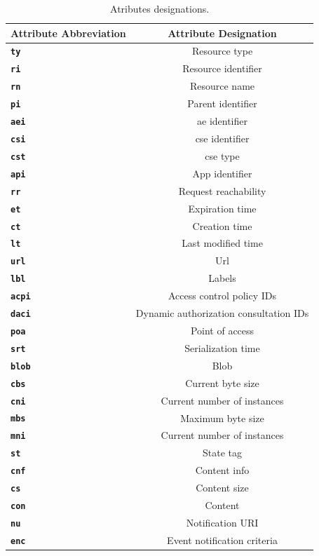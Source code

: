 \documentclass[a4paper,fleqn]{cas-dc}
\begin{document}
\begin{table}[h]
	\scriptsize
	\caption{Atributes designations.}
	\label{tab:attributesDesignations}
	\begin{tabular}{ >{\bfseries}p{1.5cm} c }
		\hline
		\textbf{Attribute Abbreviation} & \textbf{Attribute Designation} \\
		\hline \hline
		\texttt{ty} & Resource type \\
		\hline
		\texttt{ri} & Resource identifier \\
		\hline
		\texttt{rn} & Resource name \\
		\hline
		\texttt{pi} & Parent identifier \\
		\hline
		\texttt{aei} & \gls{ae} identifier \\
		\hline
		\texttt{csi} & \gls{cse} identifier \\
		\hline
		\texttt{cst} & \gls{cse} type \\
		\hline
		\texttt{api} & App identifier \\
		\hline
		\texttt{rr} & Request reachability \\
		\hline
		\texttt{et} & Expiration time \\
		\hline
		\texttt{ct} & Creation time \\
		\hline
		\texttt{lt} & Last modified time \\
		\hline
		\texttt{url} & Url \\
		\hline
		\texttt{lbl} & Labels \\
		\hline
		\texttt{acpi} & Access control policy IDs \\
		\hline
		\texttt{daci} & Dynamic authorization consultation IDs \\
		\hline
		\texttt{poa} & Point of access \\
		\hline
		\texttt{srt} & Serialization time \\
		\hline
		\texttt{blob} & Blob \\
		\hline
		\texttt{cbs} & Current byte size \\
		\hline
		\texttt{cni} & Current number of instances \\
		\hline
		\texttt{mbs} & Maximum byte size \\
		\hline
		\texttt{mni} & Current number of instances \\
		\hline
		\texttt{st} & State tag \\
		\hline
		\texttt{cnf} & Content info \\
		\hline
		\texttt{cs} & Content size \\
		\hline
		\texttt{con} & Content \\
		\hline
		\texttt{nu} & Notification URI \\
		\hline
		\texttt{enc} & Event notification criteria \\
		\hline
	\end{tabular}
\end{table}
\end{document}
